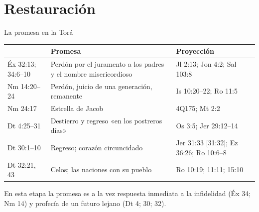 \section{Restauración}
\begin{frame}{La promesa en la Torá}
\centering\scriptsize\renewcommand{\arraystretch}{1.3}
\begin{tabular}{>{\RaggedRight\arraybackslash}p{2.2cm}>{\RaggedRight\arraybackslash}p{4.7cm}>{\RaggedRight\arraybackslash}p{4.5cm}}
\toprule
{\color{ladrillo}\bfseries Texto} & {\color{ladrillo}\bfseries Promesa} & {\color{ladrillo}\bfseries Proyección}\\\midrule
Éx 32:13; 34:6--10 & Perdón por el juramento a los padres y el nombre misericordioso & Jl 2:13; Jon 4:2; Sal 103:8\\
Nm 14:20--24 & Perdón, juicio de una generación, remanente & Is 10:20--22; Ro 11:5\\
Nm 24:17 & Estrella de Jacob & 4Q175; Mt 2:2\\
Dt 4:25--31 & Destierro y regreso «en los postreros días» & Os 3:5; Jer 29:12--14\\
Dt 30:1--10 & Regreso; corazón circuncidado & Jer 31:33 [31:32]; Ez 36:26; Ro 10:6--8\\
Dt 32:21, 43 & Celos; las naciones con su pueblo & Ro 10:19; 11:11; 15:10\\
\bottomrule
\end{tabular}
\elabpropia
\vspace{6pt}
\begin{clave}En esta etapa la promesa es a la vez respuesta inmediata a la infidelidad (Éx 34; Nm 14) y profecía de un futuro lejano (Dt 4; 30; 32).\end{clave}
\end{frame}

